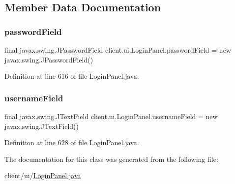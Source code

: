 \subsection{Member Data Documentation}
\hypertarget{classclient_1_1ui_1_1_login_panel_a4b3258e8faace6462f58c79cb4a08835}{}\label{classclient_1_1ui_1_1_login_panel_a4b3258e8faace6462f58c79cb4a08835} 
\subsubsection{\texorpdfstring{password\+Field}{passwordField}}
{\footnotesize\ttfamily final javax.\+swing.\+J\+Password\+Field client.\+ui.\+Login\+Panel.\+password\+Field = new javax.\+swing.\+J\+Password\+Field()}



Definition at line 616 of file Login\+Panel.\+java.

\hypertarget{classclient_1_1ui_1_1_login_panel_a3a01950b4312782aa5d78d22d257e19e}{}\label{classclient_1_1ui_1_1_login_panel_a3a01950b4312782aa5d78d22d257e19e} 
\subsubsection{\texorpdfstring{username\+Field}{usernameField}}
{\footnotesize\ttfamily final javax.\+swing.\+J\+Text\+Field client.\+ui.\+Login\+Panel.\+username\+Field = new javax.\+swing.\+J\+Text\+Field()}



Definition at line 628 of file Login\+Panel.\+java.



The documentation for this class was generated from the following file\+:\begin{DoxyCompactItemize}
\item 
client/ui/\hyperlink{_login_panel_8java}{Login\+Panel.\+java}\end{DoxyCompactItemize}
